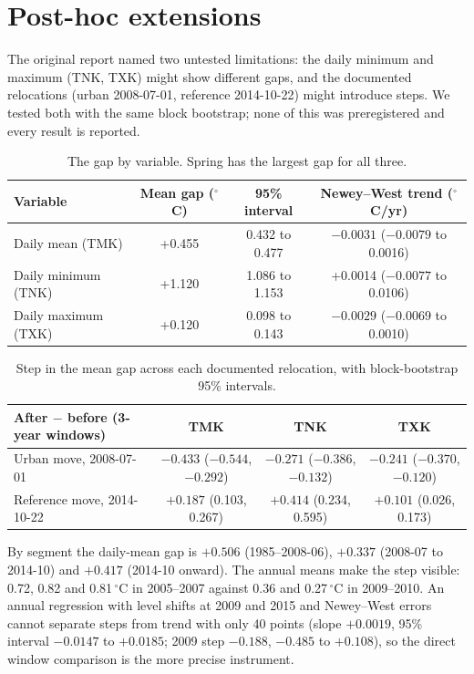 \documentclass[11pt]{article}
\begin{document}
\section{Post-hoc extensions}
The original report named two untested limitations: the daily minimum and maximum (TNK, TXK) might show different gaps, and
the documented relocations (urban 2008-07-01, reference 2014-10-22) might introduce steps. We tested both with the same
block bootstrap; none of this was preregistered and every result is reported.
\begin{table}[h]
\centering\small
\begin{tabular}{lccc}
\toprule
Variable & Mean gap ($^{\circ}$C) & 95\% interval & Newey--West trend ($^{\circ}$C/yr)\\
\midrule
Daily mean (TMK) & +0.455 & 0.432 to 0.477 & $-0.0031$ ($-0.0079$ to 0.0016)\\
Daily minimum (TNK) & +1.120 & 1.086 to 1.153 & +0.0014 ($-0.0077$ to 0.0106)\\
Daily maximum (TXK) & +0.120 & 0.098 to 0.143 & $-0.0029$ ($-0.0069$ to 0.0010)\\
\bottomrule
\end{tabular}
\caption{The gap by variable. Spring has the largest gap for all three.}
\end{table}
\begin{table}[h]
\centering\footnotesize\setlength{\tabcolsep}{3pt}
\begin{tabular}{lccc}
\toprule
After $-$ before (3-year windows) & TMK & TNK & TXK\\
\midrule
Urban move, 2008-07-01 & $-0.433$ ($-0.544$, $-0.292$) & $-0.271$ ($-0.386$, $-0.132$) & $-0.241$ ($-0.370$, $-0.120$)\\
Reference move, 2014-10-22 & $+0.187$ (0.103, 0.267) & $+0.414$ (0.234, 0.595) & $+0.101$ (0.026, 0.173)\\
\bottomrule
\end{tabular}
\caption{Step in the mean gap across each documented relocation, with block-bootstrap 95\% intervals.}
\end{table}
By segment the daily-mean gap is $+0.506$ (1985--2008-06), $+0.337$ (2008-07 to 2014-10) and $+0.417$ (2014-10 onward). The annual
means make the step visible: 0.72, 0.82 and 0.81\,$^{\circ}$C in 2005--2007 against 0.36 and 0.27\,$^{\circ}$C in 2009--2010. An annual
regression with level shifts at 2009 and 2015 and Newey--West errors cannot separate steps from trend with only 40 points (slope
$+0.0019$, 95\% interval $-0.0147$ to $+0.0185$; 2009 step $-0.188$, $-0.485$ to $+0.108$), so the direct window comparison is the
more precise instrument.
\end{document}
